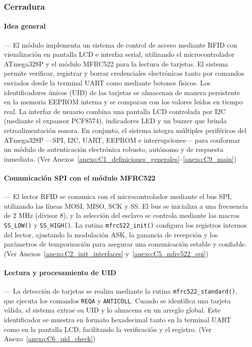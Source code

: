 \subsubsection{\textbf{Cerradura}}

\paragraph*{\textbf{Idea general}}---
El módulo implementa un sistema de control de acceso mediante RFID con visualización en pantalla LCD e interfaz serial, utilizando el microcontrolador ATmega328P y el módulo MFRC522 para la lectura de tarjetas. El sistema permite verificar, registrar y borrar credenciales electrónicas tanto por comandos enviados desde la terminal UART como mediante botones físicos. Los identificadores únicos (UID) de las tarjetas se almacenan de manera persistente en la memoria EEPROM interna y se comparan con los valores leídos en tiempo real. La interfaz de usuario combina una pantalla LCD controlada por I2C (mediante el expansor PCF8574), indicadores LED y un buzzer que brinda retroalimentación sonora. En conjunto, el sistema integra múltiples periféricos del ATmega328P —SPI, I2C, UART, EEPROM e interrupciones— para conformar un módulo de autenticación electrónica robusto, autónomo y de respuesta inmediata. (Ver Anexos~\ref{anexo:C1_definiciones_generales}–\ref{anexo:C9_main})

\vspace{1em}

\paragraph*{\textbf{Comunicación SPI con el módulo MFRC522}}---
El lector RFID se comunica con el microcontrolador mediante el bus SPI, utilizando las líneas MOSI, MISO, SCK y SS. El bus se inicializa a una frecuencia de 2 MHz (divisor 8), y la selección del esclavo se controla mediante las macros \texttt{SS\_LOW()} y \texttt{SS\_HIGH()}. La rutina \texttt{mfrc522\_init()} configura los registros internos del lector, ajustando la modulación ASK, la ganancia de recepción y los parámetros de temporización para asegurar una comunicación estable y confiable. (Ver Anexos~\ref{anexo:C2_init_interfaces} y~\ref{anexo:C5_mfrc522_spi})

\vspace{1em}

\paragraph*{\textbf{Lectura y procesamiento de UID}}---
La detección de tarjetas se realiza mediante la rutina \texttt{mfrc522\_standard()}, que ejecuta los comandos \texttt{REQA} y \texttt{ANTICOLL}. Cuando se identifica una tarjeta válida, el sistema extrae su UID y lo almacena en un arreglo global. Este identificador se muestra en formato hexadecimal tanto en la terminal UART como en la pantalla LCD, facilitando la verificación y el registro. (Ver Anexo~\ref{anexo:C6_uid_check})

